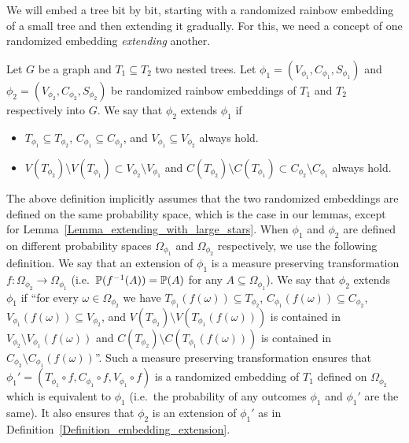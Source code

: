 We will embed a tree bit by bit, starting with a randomized rainbow embedding of a small tree and then extending it gradually. For this, we need a concept of one randomized embedding \emph{extending} another.
\begin{definition}\label{Definition_embedding_extension}
Let $G$ be a graph and $T_1\subseteq T_2$ two nested trees. Let $\phi_1=(V_{\phi_1}, C_{\phi_1}, S_{\phi_1})$ and $\phi_2=(V_{\phi_2}, C_{\phi_2}, S_{\phi_2})$ be randomized rainbow embeddings of $T_1$ and $T_2$ respectively into $G$. We say that $\phi_2$ extends $\phi_1$ if
\begin{itemize}
\item $T_{\phi_1}\subseteq T_{\phi_2}$, $C_{\phi_1}\subseteq C_{\phi_2}$, and $V_{\phi_1}\subseteq V_{\phi_2}$ always hold.
\item $V(T_{\phi_2})\setminus V(T_{\phi_1})\subset V_{\phi_2}\setminus V_{\phi_1}$ and $C(T_{\phi_2})\setminus C(T_{\phi_1})\subset C_{\phi_2}\setminus C_{\phi_1}$ always hold.
\end{itemize}
\end{definition}
The above definition implicitly assumes that the two randomized embeddings are defined on the same probability space, which is the case in our lemmas, except for Lemma~\ref{Lemma_extending_with_large_stars}. When $\phi_1$ and $\phi_2$ are defined on different probability spaces $\Omega_{\phi_1}$ and $\Omega_{\phi_2}$ respectively, we use the following definition. We say that an extension of $\phi_1$ is a  measure preserving transformation $f:\Omega_{\phi_2}\to \Omega_{\phi_1}$ (i.e.\ $\P(f^{-1}(A))=\P(A)$ for any $A\subseteq \Omega_{\phi_1}$). We say that $\phi_2$ extends $\phi_1$ if ``for every $\omega\in \Omega_{\phi_2}$ we have $T_{\phi_1}( f(\omega))\subseteq T_{\phi_2}$, $C_{\phi_1}( f(\omega))\subseteq C_{\phi_2}$,  $V_{\phi_1}( f(\omega))\subseteq V_{\phi_2}$, and $V(T_{\phi_2})\setminus V(T_{\phi_1}( f(\omega)))$ is 
contained in $V_{\phi_2}\setminus V_{\phi_1}( f(\omega))$ and $C(T_{\phi_2})\setminus C(T_{\phi_1}(f(\omega)))$ is contained in 
$C_{\phi_2}\setminus C_{\phi_1}( f(\omega))$''. Such a measure preserving transformation ensures that $\phi_1'=(T_{\phi_1}\circ f, C_{\phi_1}\circ f, V_{\phi_1}\circ f)$ is a randomized embedding of $T_1$ defined on $\Omega_{\phi_2}$ which is equivalent to $\phi_1$ (i.e.\ the probability of any outcomes  $\phi_1$ and $\phi_1'$ are the same). It also ensures that $\phi_2$ is an extension of $\phi_1'$ as in Definition~\ref{Definition_embedding_extension}.



